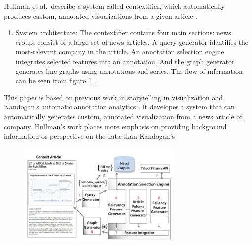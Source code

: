 \documentclass{egpubl}
\begin{document}
Hullman et al.\ describe a system called contextifier, which automatically produces custom, annotated visualizations from a given article \cite{hullman2013}. 
\begin{enumerate}
\item System architecture: The contextifier contains four main sections: news croups consist of a large set of news articles. A query generator identifies the most-relevant company in the article. An annotation selection engine integrates selected features into an annotation. And the graph generator generates line graphs using annotations and series. The flow of information can be seen from figure \ref{fig:hullman2013} \cite{hullman2013}.
\end{enumerate}
This paper is based on previous work in storytelling in visualization \cite{segal} and Kandogan's automatic annotation analytics \cite{kandogan2012}. It developes a system that can automatically generates custom, annotated visualization from a news article of company. Hullman's work places more emphasis on providing background information or perspective on the data than Kandogan's \cite{kandogan2012}
\begin{figure}
\begingroup
\centering
\includegraphics[width=8cm]{./images/hullman2013}
\label{fig:hullman2013}
\endgroup
\end{figure}
\end{document}
